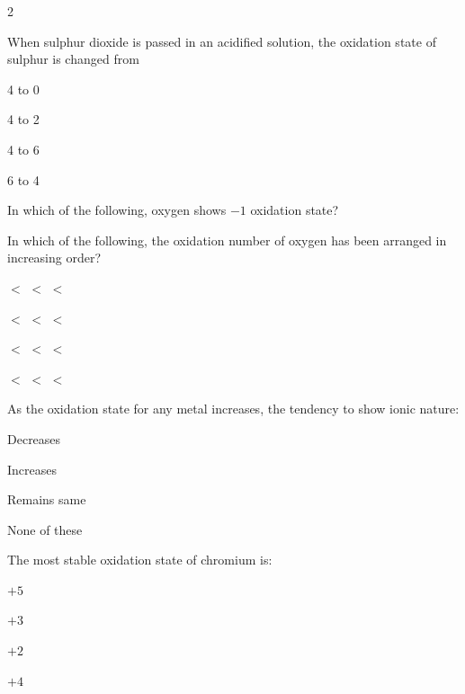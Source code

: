 \documentclass[10pt,a4paper]{article}
\begin{document}
\begin{multicols}{2}
\begin{questions}[start=56]
\item When sulphur dioxide is passed in an acidified  solution, the oxidation state of sulphur is changed from
\begin{options}
  \item 4 to 0
  \item 4 to 2
  \item 4 to 6
  \item 6 to 4
\end{options}

\item In which of the following, oxygen shows $-1$ oxidation state?
\begin{options}
  \item {}
  \item {}
  \item {}
  \item {}
\end{options}

\item In which of the following, the oxidation number of oxygen has been arranged in increasing order?
\begin{options}
  \item {} $<$  $<$  $<$ 
  \item {} $<$  $<$  $<$ 
  \item {} $<$  $<$  $<$ 
  \item {} $<$  $<$  $<$ 
\end{options}

\item As the oxidation state for any metal increases, the tendency to show ionic nature:
\begin{options}
  \item Decreases
  \item Increases
  \item Remains same
  \item None of these
\end{options}

\item The most stable oxidation state of chromium is:
\begin{options}
  \item $+5$
  \item $+3$
  \item $+2$
  \item $+4$
\end{options}

\end{questions}
\end{multicols}
\end{document}

